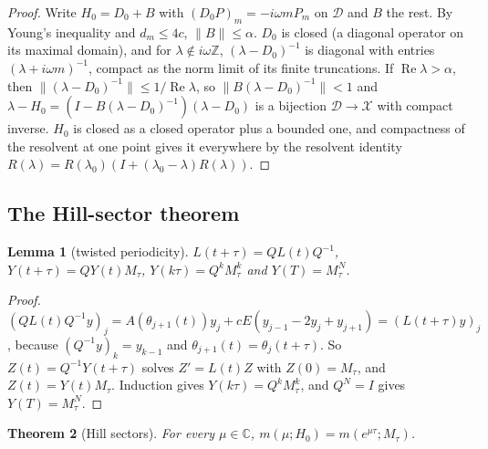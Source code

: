 \documentclass[11pt]{article}
\newtheorem{lemma}{Lemma}[section]
\newtheorem{thmx}[lemma]{Theorem}
\theoremstyle{definition}
\newcommand{\C}{\mathbb{C}}
\newcommand{\Z}{\mathbb{Z}}
\newcommand{\re}{\operatorname{Re}}
\newcommand{\Dsp}{\mathcal{D}}
\newcommand{\Xsp}{\mathcal{X}}
\begin{document}
\begin{proof}
Write $H_0 = D_0 + B$ with $(D_0P)_m = -i\omega mP_m$ on $\Dsp$ and $B$ the rest. By Young's inequality and $d_m \le 4c$, $\|B\| \le \alpha$. $D_0$ is closed (a diagonal operator on its maximal domain), and for $\lambda \notin i\omega\Z$, $(\lambda - D_0)^{-1}$ is diagonal with entries $(\lambda + i\omega m)^{-1}$, compact as the norm limit of its finite truncations. If $\re\lambda > \alpha$, then $\|(\lambda - D_0)^{-1}\| \le 1/\re\lambda$, so $\|B(\lambda - D_0)^{-1}\| < 1$ and $\lambda - H_0 = (I - B(\lambda - D_0)^{-1})(\lambda - D_0)$ is a bijection $\Dsp \to \Xsp$ with compact inverse. $H_0$ is closed as a closed operator plus a bounded one, and compactness of the resolvent at one point gives it everywhere by the resolvent identity $R(\lambda) = R(\lambda_0)(I + (\lambda_0 - \lambda)R(\lambda))$.
\end{proof}

\subsection{The Hill-sector theorem}\label{sec:hillsector}

\begin{lemma}[twisted periodicity]\label{lem:twist}
$L(t + \tau) = QL(t)Q^{-1}$, $Y(t + \tau) = QY(t)M_\tau$, $Y(k\tau) = Q^kM_\tau^k$ and $Y(T) = M_\tau^N$.
\end{lemma}

\begin{proof}
$(QL(t)Q^{-1}y)_j = A(\theta_{j+1}(t))y_j + cE(y_{j-1} - 2y_j + y_{j+1}) = (L(t + \tau)y)_j$, because $(Q^{-1}y)_k = y_{k-1}$ and $\theta_{j+1}(t) = \theta_j(t + \tau)$. So $Z(t) = Q^{-1}Y(t + \tau)$ solves $Z' = L(t)Z$ with $Z(0) = M_\tau$, and $Z(t) = Y(t)M_\tau$. Induction gives $Y(k\tau) = Q^kM_\tau^k$, and $Q^N = I$ gives $Y(T) = M_\tau^N$.
\end{proof}

\begin{thmx}[Hill sectors]\label{thm:hill}
For every $\mu \in \C$, $m(\mu; H_0) = m(e^{\mu\tau}; M_\tau)$.
\end{thmx}
\end{document}
